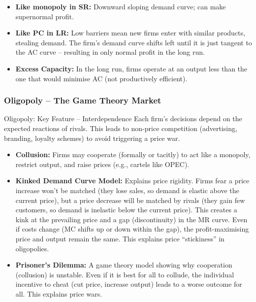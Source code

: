 \documentclass[11pt, a4paper, twoside]{book}
\begin{document}
\begin{itemize}
  \item \textbf{Like monopoly in SR:} Downward sloping demand curve; can make supernormal profit.
  \item \textbf{Like PC in LR:} Low barriers mean new firms enter with similar products, stealing demand. The firm's demand curve shifts left until it is just tangent to the AC curve -- resulting in only normal profit in the long run.
  \item \textbf{Excess Capacity:} In the long run, firms operate at an output less than the one that would minimise AC (not productively efficient).
\end{itemize}

\subsubsection{Oligopoly -- The Game Theory Market}

\begin{keyterm}{Oligopoly: Key Feature -- Interdependence}
Each firm's decisions depend on the expected reactions of rivals. This leads to non-price competition (advertising, branding, loyalty schemes) to avoid triggering a price war.
\end{keyterm}

\begin{itemize}
  \item \textbf{Collusion:} Firms may cooperate (formally or tacitly) to act like a monopoly, restrict output, and raise prices (e.g., cartels like OPEC).
  \item \textbf{Kinked Demand Curve Model:} Explains price rigidity. Firms fear a price increase won't be matched (they lose sales, so demand is elastic above the current price), but a price decrease will be matched by rivals (they gain few customers, so demand is inelastic below the current price). This creates a kink at the prevailing price and a gap (discontinuity) in the MR curve. Even if costs change (MC shifts up or down within the gap), the profit-maximising price and output remain the same. This explains price ``stickiness'' in oligopolies.
  \item \textbf{Prisoner's Dilemma:} A game theory model showing why cooperation (collusion) is unstable. Even if it is best for all to collude, the individual incentive to cheat (cut price, increase output) leads to a worse outcome for all. This explains price wars.
\end{itemize}
\end{document}
